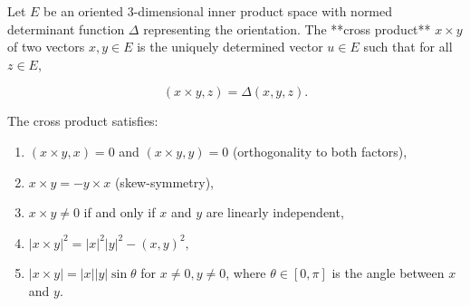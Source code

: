 Let \(E\) be an oriented \(3\)-dimensional inner product space with normed determinant function \(\Delta\) representing the orientation. The **cross product** \(x \times y\) of two vectors \(x, y \in E\) is the uniquely determined vector \(u \in E\) such that for all \(z \in E\),

$$(x \times y, z) = \Delta(x, y, z).$$

The cross product satisfies:
\begin{enumerate}
\item \((x \times y, x) = 0\) and \((x \times y, y) = 0\) (orthogonality to both factors),
\item \(x \times y = -y \times x\) (skew-symmetry),
\item \(x \times y \neq 0\) if and only if \(x\) and \(y\) are linearly independent,
\item \(|x \times y|^2 = |x|^2 |y|^2 - (x, y)^2,\)
\item \(|x \times y| = |x| |y| \sin \theta\) for \(x \neq 0, y \neq 0\), where \(\theta \in [0, \pi]\) is the angle between \(x\) and \(y\).
\end{enumerate}
